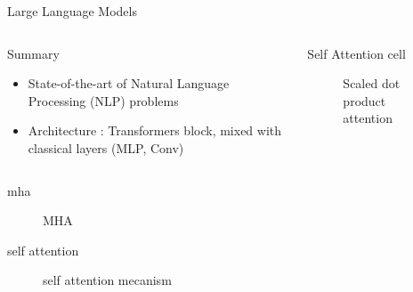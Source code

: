 \begin{frame}{Large Language Models}
\begin{columns}
      
    \begin{column}[t]{0.5\textwidth}
    \begin{block}{Summary}
    
        \begin{itemize}
            \item State-of-the-art of Natural Language Processing (NLP) problems
            \item Architecture : Transformers\cite{NIPS2017_3f5ee243} block, mixed with classical layers (MLP, Conv)
        \end{itemize}
            

    \end{block}
    \end{column}
        
    \begin{column}[t]{0.5\textwidth}
    \begin{block}{Self Attention cell}

        \begin{figure}
            \centering
            
            \caption{Scaled dot product attention}
        \end{figure}
    

    \end{block}
    \end{column}
         
\end{columns}
\end{frame}


\begin{frame}{mha}
    \begin{figure}
        \centering
        
        \caption{MHA}
    \end{figure}  
        

    
\end{frame}



\begin{frame}{self attention}
    \begin{figure}
        \centering
        
        \caption{self attention mecanism}
    \end{figure}  
        

    
\end{frame}


